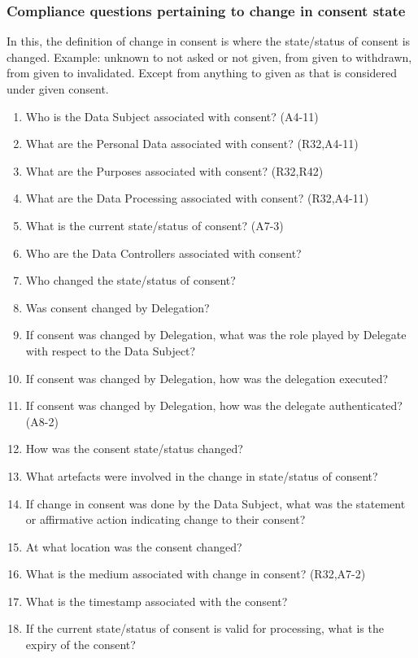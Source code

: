 \subsubsection{Compliance questions pertaining to change in consent state}
In this, the definition of change in consent is where the state/status of consent is changed. Example: unknown to not asked or not given, from given to withdrawn, from given to invalidated. Except from anything to given as that is considered under given consent.
\begin{enumerate}[label={\textit{CMQ.\theenumi}},resume]
    \item Who is the Data Subject associated with consent? (A4-11)
    \item What are the Personal Data associated with consent? (R32,A4-11)
    \item What are the Purposes associated with consent? (R32,R42)
    \item What are the Data Processing associated with consent? (R32,A4-11)
    \item What is the current state/status of consent? (A7-3)
    \item Who are the Data Controllers associated with consent?
    \item Who changed the state/status of consent?
    \item Was consent changed by Delegation?
    \item If consent was changed by Delegation, what was the role played by Delegate with respect to the Data Subject?
    \item If consent was changed by Delegation, how was the delegation executed?
    \item If consent was changed by Delegation, how was the delegate authenticated? (A8-2)
    \item How was the consent state/status changed?
    \item What artefacts were involved in the change in state/status of consent?
    \item If change in consent was done by the Data Subject, what was the statement or affirmative action indicating change to their consent?
    \item At what location was the consent changed?
    \item What is the medium associated with change in consent? (R32,A7-2)
    \item What is the timestamp associated with the consent?
    \item If the current state/status of consent is valid for processing, what is the expiry of the consent?
\end{enumerate}


